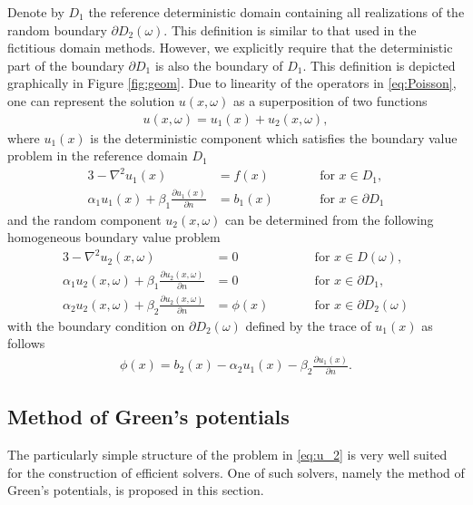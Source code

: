 Denote by $D_1$ the reference deterministic domain containing all realizations of the random boundary $\partial D_2(\omega)$.
This definition is similar to that used in the fictitious domain methods. 
However, we explicitly require that the deterministic part of the boundary $\partial D_1$ is also the boundary of $D_1$.
This definition is depicted graphically in Figure \ref{fig:geom}.
Due to linearity of the operators in \eqref{eq:Poisson}, one can represent the solution $u(x,\omega)$ as a superposition of two functions 
\begin{align}\label{eq:superpos}
	u(x,\omega) = u_1(x) + u_2(x,\omega),
\end{align}
where $u_1(x)$ is the deterministic component which satisfies the boundary value problem in the reference domain $D_1$
\begin{alignat}{3} \label{eq:u_1}
	-\nabla^2 u_1(x)                                               & = f(x)  &\qquad &\text{for } x \in D_1,
	\\ \nonumber
	\alpha_1 u_1(x) + \beta_1 \frac{\partial u_1(x)}{\partial n}   & = b_1(x)  &\qquad &\text{for } x \in \partial D_1
\end{alignat}
and the random component $u_2(x,\omega)$ can be determined from the following homogeneous boundary value problem
\begin{alignat}{3} \label{eq:u_2}
	\nonumber
	-\nabla^2 u_2(x,\omega)                                                      & = 0  &\qquad &\text{for } x \in D(\omega),
	\\ 
	\alpha_1 u_2(x,\omega) + \beta_1 \frac{\partial u_2(x,\omega)}{\partial n}   & = 0  &\qquad &\text{for } x \in \partial D_1,
	\\ \nonumber
	\alpha_2 u_2(x,\omega) + \beta_2 \frac{\partial u_2(x,\omega)}{\partial n}   & = \phi(x)  &\qquad &\text{for } x \in \partial D_2(\omega)
\end{alignat}
with the boundary condition on $\partial D_2(\omega)$ defined by the trace of $u_1(x)$ as follows
\begin{align} \label{eq:BC}
	\phi(x) = b_2(x) - \alpha_2 u_1(x) - \beta_2 \frac{\partial u_1(x)}{\partial n}.
\end{align}



\subsection{Method of Green's potentials}

The particularly simple structure of the problem in \eqref{eq:u_2} is very well suited for the construction of efficient solvers.
One of such solvers, namely the method of Green's potentials, is proposed in this section.

